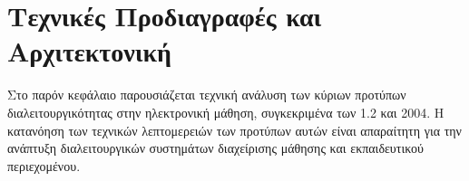 \chapter{Τεχνικές Προδιαγραφές και Αρχιτεκτονική}
\label{ch:technical_specifications}
\label{chap:standards}

Στο παρόν κεφάλαιο παρουσιάζεται τεχνική ανάλυση των κύριων προτύπων διαλειτουργικότητας στην ηλεκτρονική μάθηση, συγκεκριμένα των  1.2 και  2004. Η κατανόηση των τεχνικών λεπτομερειών των προτύπων αυτών είναι απαραίτητη για την ανάπτυξη διαλειτουργικών συστημάτων διαχείρισης μάθησης και εκπαιδευτικού περιεχομένου.




